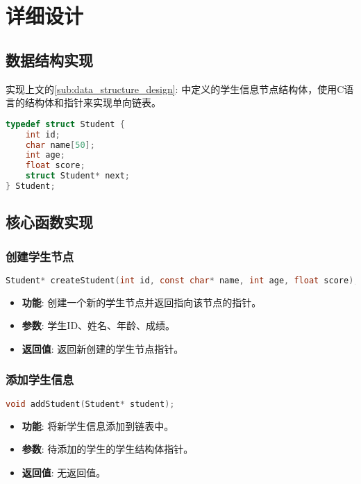 \section{详细设计}

\subsection{数据结构实现}
实现上文的\ref{sub:data_structure_design}: 中定义的学生信息节点结构体，使用C语言的结构体和指针来实现单向链表。
\begin{lstlisting}[language=C, caption=学生信息节点结构体]
typedef struct Student {
    int id;
    char name[50];
    int age;
    float score;
    struct Student* next;
} Student;
\end{lstlisting}

\subsection{核心函数实现}

\subsubsection{创建学生节点}
\begin{lstlisting}[language=C, caption=创建学生节点函数]
Student* createStudent(int id, const char* name, int age, float score);
\end{lstlisting}
\begin{itemize}
    \item \textbf{\textcolor{mydeepgreen}{功能}}: 创建一个新的学生节点并返回指向该节点的指针。
    \item \textbf{\textcolor{mydeepgreen}{参数}}: 学生ID、姓名、年龄、成绩。
    \item \textbf{\textcolor{mydeepgreen}{返回值}}: 返回新创建的学生节点指针。
\end{itemize}

\subsubsection{添加学生信息}
\begin{lstlisting}[language=C, caption=添加学生信息函数]
void addStudent(Student* student);
\end{lstlisting}
\begin{itemize}
    \item \textbf{\textcolor{mydeepgreen}{功能}}: 将新学生信息添加到链表中。
    \item \textbf{\textcolor{mydeepgreen}{参数}}: 待添加的学生的学生结构体指针。
    \item \textbf{\textcolor{mydeepgreen}{返回值}}: 无返回值。
\end{itemize}

